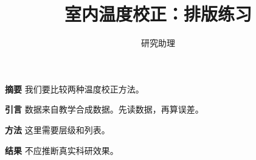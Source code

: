 \documentclass[UTF8,fontset=fandol,a4paper,11pt]{ctexart}
\title{室内温度校正：排版练习}
\author{研究助理}
\date{}
\begin{document}
\maketitle
\textbf{摘要} 我们要比较两种温度校正方法。

\textbf{引言} 数据来自教学合成数据。先读数据，再算误差。

\textbf{方法} 这里需要层级和列表。

\textbf{结果} 不应推断真实科研效果。
\end{document}
